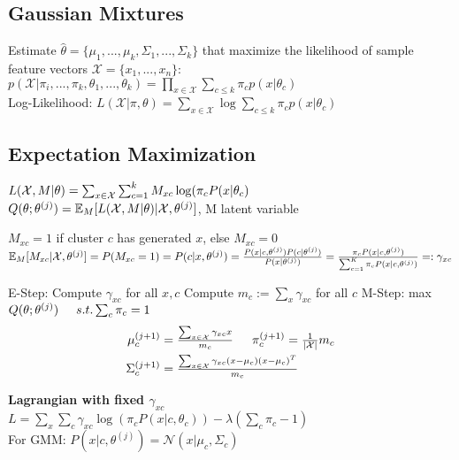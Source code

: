 \subsection*{Gaussian Mixtures}
	Estimate $\hat{\theta} = \{\mu_1,...,\mu_k, \Sigma_1,...,\Sigma_k\}$ that maximize the likelihood of sample feature vectors $\mathcal{X} = \{x_1,..., x_n \}$: \\
	$p(\mathcal{X} | \pi_i, ..., \pi_k, \theta_1, ..., \theta_k) = \prod_{x \in \mathcal{X}} \sum_{c\leq k}  \pi_c p(x|\theta_c)$\\
	Log-Likelihood: $L(\mathcal{X} | \pi, \theta) = \sum_{x\in \mathcal{X}}
	 \log \sum_{c \leq k} \pi_c p(x|\theta_c)$
	
\subsection*{Expectation Maximization}
$L(\mathcal{X},M|\theta) = \sum_{x \in \mathcal{X}} \sum_{c=1}^k M_{xc} \log(\pi_c P(x|\theta_c)$ \\
$Q(\theta; \theta^{(j)}) = \mathbb{E}_{M}[L(\mathcal{X},M|\theta)| \mathcal{X}, \theta^{(j)}]$, M latent variable

$M_{xc} = 1$ if cluster $c$ has generated $x$, else $M_{xc} = 0$
$\\ \mathbb{E}_M[M_{xc}|\mathcal{X}, \theta^{(j)}] = P(M_{xc}=1) = P(c | x, \theta^{(j)}) = 
\frac{P(x|c,\theta^{(j)}) P(c|\theta^{(j)})}{P(x|\theta^{(j)})}
= \frac{\pi_c P(x|c,\theta^{(j)})}{\sum_{c=1}^K \pi_c P(x|c,\theta^{(j)})} 
=: \gamma_{xc}$
\begin{algorithmic}[1]
	\State E-Step:
		\tab Compute $\gamma_{xc}$ for all $x, c$
		\tab Compute $m_c := \sum_x \gamma_{xc}$ for all $c$
	\State M-Step: max $Q(\theta; \theta^{(j)}) \hspace{5mm} s.t. \sum_c \pi_c = 1$
    	\vspace{-3mm}
    	\addtolength{\jot}{-3mm}
		\begin{align*}
			\mu_c^{(j+1)} &= \tfrac{\sum_{x \in \mathcal{X}} \gamma_{xc} x}{m_c} \hskip 15pt  
			\pi_c^{(j+1)} = \tfrac{1}{|\mathcal{X}|} m_c \\
			\Sigma_c^{(j+1)} &= \tfrac{\sum_{x \in \mathcal{X}} \gamma_{xc}(x-\mu_c)(x-\mu_c)^T}
				{m_c} 
		\end{align*}
        \vspace{-6mm}
	\EndWhile
\end{algorithmic}

\textbf{Lagrangian with fixed $\gamma_{xc}$} \mbox{}\\
$L = \sum_x \sum_c \gamma_{xc} \log(\pi_c P(x|c,\theta_c)) - 
\lambda(\sum_c \pi_c - 1)$\\
For GMM: $P(x|c,\theta^{(j)}) = \mathcal{N}(x | \mu_c, \Sigma_c)$

